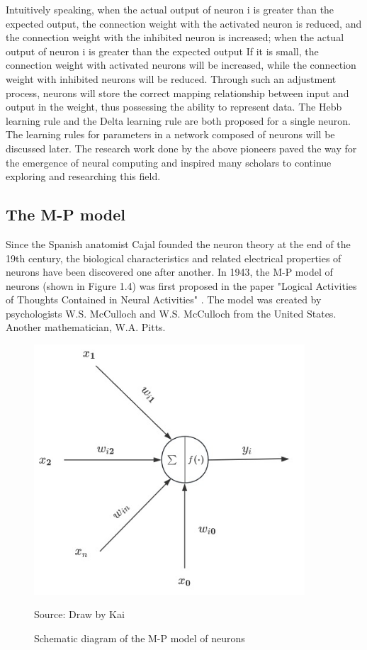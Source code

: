 \documentclass[paper=a4, fontsize=11pt]{scrartcl} %
\numberwithin{equation}{section} %
\numberwithin{figure}{section} %
\numberwithin{table}{section} %
\begin{document}
Intuitively speaking, when the actual output of neuron i is greater than the expected output, the connection weight with the activated neuron is reduced, and the connection weight with the inhibited neuron is increased; when the actual output of neuron i is greater than the expected output If it is small, the connection weight with activated neurons will be increased, while the connection weight with inhibited neurons will be reduced. Through such an adjustment process, neurons will store the correct mapping relationship between input and output in the weight, thus possessing the ability to represent data. The Hebb learning rule and the Delta learning rule are both proposed for a single neuron. The learning rules for parameters in a network composed of neurons will be discussed later. The research work done by the above pioneers paved the way for the emergence of neural computing and inspired many scholars to continue exploring and researching this field.

\subsection{The M-P model}
Since the Spanish anatomist Cajal founded the neuron theory at the end of the 19th century, the biological characteristics and related electrical properties of neurons have been discovered one after another. In 1943, the M-P model of neurons (shown in Figure 1.4) was first proposed in the paper "Logical Activities of Thoughts Contained in Neural Activities" \cite{Mcculloch1854LOGICALCALCULUSIDEAS}. The model was created by psychologists W.S. McCulloch and W.S. McCulloch from the United States. Another mathematician, W.A. Pitts.

\begin{figure}[H]
    \centering
    \includegraphics[width=0.9\textwidth]{./data/M-P.jpg}
    \caption{Schematic diagram of the M-P model of neurons}
    \label{fig:my_picture}
    \vspace{1pt} %
    \small{Source: Draw by Kai}
\end{figure}
\end{document}
